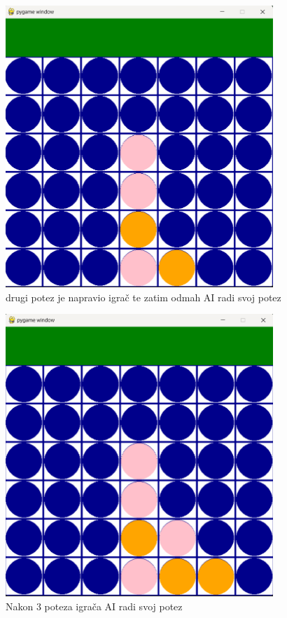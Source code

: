 \documentclass[]{foi}
\begin{document}
\begin{figure}[]
    \centering
    \includegraphics[width=0.9\textwidth]{slike/2.png}
    \caption{drugi potez je napravio igrač te zatim odmah AI radi svoj potez}
    \label{Slika1}
\end{figure}

\begin{figure}[]
    \centering
    \includegraphics[width=0.9\textwidth]{slike/3.png}
    \caption{Nakon 3 poteza igrača AI radi svoj potez}
    \label{Slika1}
\end{figure}
\end{document}
